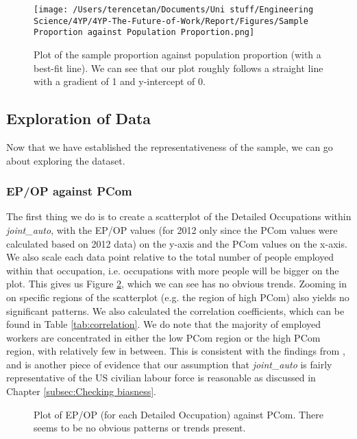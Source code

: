 \documentclass[11pt]{article}
\begin{document}
\begin{figure}[!htb]
	\centering
	\texttt{[image: /Users/terencetan/Documents/Uni stuff/Engineering Science/4YP/4YP-The-Future-of-Work/Report/Figures/Sample Proportion against Population Proportion.png]}
	\caption{Plot of the sample proportion against population proportion (with a best-fit line). We can see that our plot roughly follows a straight line with a gradient of 1 and y-intercept of 0.}
	\label{fig:sampleprop vs popprop}
\end{figure}

\subsection{Exploration of Data}
Now that we have established the representativeness of the sample, we can go about exploring the dataset. 

\subsubsection*{EP/OP against PCom}

The first thing we do is to create a scatterplot of the Detailed Occupations within \emph{joint\_auto}, with the EP/OP values (for 2012 only since the PCom values were calculated based on 2012 data) on the y-axis and the PCom values on the x-axis. We also scale each data point relative to the total number of people employed within that occupation, i.e. occupations with more people will be bigger on the plot. This gives us Figure \ref{fig:EP/OP against PCom}, which we can see has no obvious trends. Zooming in on specific regions of the scatterplot (e.g. the region of high PCom) also yields no significant patterns. We also calculated the correlation coefficients, which can be found in Table \ref{tab:correlation}. We do note that the majority of employed workers are concentrated in either the low PCom region or the high PCom region, with relatively few in between. This is consistent with the findings from \cite{osborne2017future}, and is another piece of evidence that our assumption that \emph{joint\_auto} is fairly representative of the US civilian labour force is reasonable as discussed in Chapter \ref{subsec:Checking biasness}. 

\begin{figure}[!htb]
	\centering
	\hfill
	\hfill
	\caption{Plot of EP/OP (for each Detailed Occupation) against PCom. There seems to be no obvious patterns or trends present.}
	\label{fig:EP/OP against PCom}
\end{figure}
\end{document}
